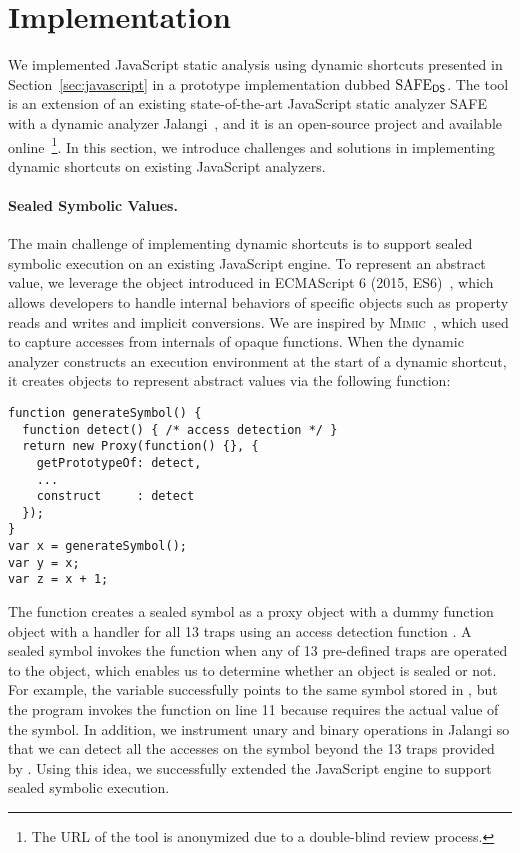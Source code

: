 \section{Implementation}\label{sec:implementation}
We implemented JavaScript static analysis using dynamic shortcuts
presented in Section~\ref{sec:javascript} in a prototype implementation dubbed
$\text{SAFE}_{\textsf{DS}}$.  The tool is an extension of an existing state-of-the-art JavaScript
static analyzer SAFE~\cite{safe, safe2} with a dynamic analyzer
Jalangi~\cite{jalangi}, and it is an open-source project and available online~\footnote{The
URL of the tool is anonymized due to a double-blind review process.}.  In this
section, we introduce challenges and solutions in implementing dynamic
shortcuts on existing JavaScript analyzers.

\paragraph{Sealed Symbolic Values.}
The main challenge of implementing dynamic shortcuts is to support sealed
symbolic execution on an existing JavaScript engine.  To represent an abstract
value, we leverage the  object introduced in ECMAScript 6
(2015, ES6)~\cite{es6}, which allows developers to handle internal behaviors
of specific objects such as property reads and writes and implicit conversions.
We are inspired by \textsc{Mimic}~\cite{mimic}, which used  to
capture accesses from internals of opaque functions.  When the dynamic analyzer
constructs an execution environment at the start of a dynamic shortcut, it
creates  objects to represent abstract values via the
following  function:
\begin{lstlisting}[style=myJSstyle]
function generateSymbol() {
  function detect() { /* access detection */ }
  return new Proxy(function() {}, {
    getPrototypeOf: detect,
    ...
    construct     : detect
  });
}
var x = generateSymbol();
var y = x;
var z = x + 1;
\end{lstlisting}
The function creates a sealed symbol as a proxy object with a dummy
function object with a handler for all 13 traps using an access detection
function .  A sealed symbol invokes the function 
when any of 13 pre-defined traps are operated to the object, which enables us to
determine whether an object is sealed or not.  For example, the variable
 successfully points to the same symbol stored in , but the
program invokes the function  on line 11 because  requires
the actual value of the symbol.  In addition, we instrument unary and binary
operations in Jalangi so that we can detect all the accesses on the
symbol beyond the 13 traps provided by .
Using this idea, we successfully extended the
JavaScript engine to support sealed symbolic execution.


